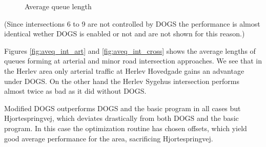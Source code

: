 \begin{figure}[htbp]
\centering
{}

\caption{Average queue length}
\end{figure}

(Since intersections 6 to 9 are not controlled by DOGS the performance is almost identical wether DOGS is enabled or not and are not shown for this reason.)

Figures \ref{fig:aveq_int_art} and \ref{fig:aveq_int_cross} shows the average lengths of queues forming at arterial and  minor road intersection approaches. We see that in the Herlev area only arterial traffic at Herlev Hovedgade gains an advantage under DOGS. On the other hand the Herlev Sygehus intersection performs almost twice as bad as it did without DOGS.

Modified DOGS outperforms DOGS and the basic program in all cases but Hjortespringvej, which deviates drastically from both DOGS and the basic program. In this case the optimization routine has chosen offsets, which yield good average performance for the area, sacrificing Hjortespringvej.

